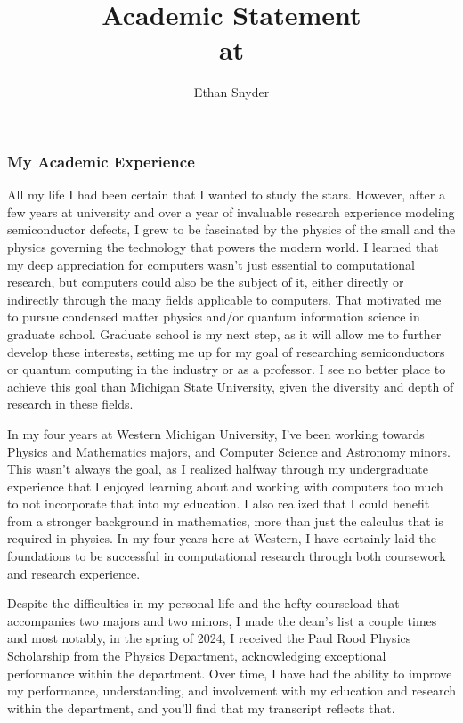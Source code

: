 \documentclass[11pt]{article}
\title{Academic Statement\\
	\large \dept{} at \school{}}
\author{Ethan Snyder}
\newcommand{\school}{Michigan State University}
\begin{document}
\maketitle
\subsubsection*{My Academic Experience}
All my life I had been certain that I wanted to study the stars. However, after a few years at university and over a year of invaluable research experience modeling semiconductor defects, I grew to be fascinated by the physics of the small and the physics governing the technology that powers the modern world. I learned that my deep appreciation for computers wasn't just essential to computational research, but computers could also be the subject of it, either directly or indirectly through the many fields applicable to computers. That motivated me to pursue condensed matter physics {}and/or quantum information science in graduate school. Graduate school is my next step, as it will allow me to further develop these interests, setting me up for my goal of researching semiconductors or quantum computing in the industry or as a professor. I see no better place to achieve this goal than \school{}, given the diversity and depth of research in these fields.

In my four years at Western Michigan University, I've been working towards Physics and Mathematics majors, and Computer Science and Astronomy minors. This wasn't always the goal, as I realized halfway through my undergraduate experience that I enjoyed learning about and working with computers too much to not incorporate that into my education. I also realized that I could benefit from a stronger background in mathematics, more than just the calculus that is required in physics. In my four years here at Western, I have certainly laid the foundations to be successful in computational research through both coursework and research experience.

Despite the difficulties in my personal life and the hefty courseload that accompanies two majors and two minors, I made the dean's list a couple times and most notably, in the spring of 2024, I received the Paul Rood Physics Scholarship from the Physics Department, acknowledging exceptional performance within the department. Over time, I have had the ability to improve my performance, understanding, and involvement with my education and research within the department, and you'll find that my transcript reflects that.
\end{document}
